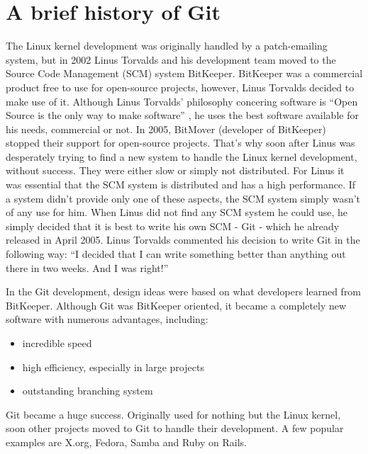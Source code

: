 \section {A brief history of Git}

The Linux kernel development was originally handled by a patch-emailing system, but in 2002 Linus Torvalds and his development team moved to the Source Code Management (SCM) system BitKeeper. BitKeeper was a commercial product free to use for open-source projects, however, Linus Torvalds decided to make use of it. Although Linus Torvalds' philosophy concering software is "`Open Source is the only way to make software"' \cite{googletechtalk2007}, he uses the best software available for his needs, commercial or not.
In 2005, BitMover (developer of BitKeeper) stopped their support for open-source projects. That's why soon after Linus was desperately trying to find a new system to handle the Linux kernel development, without success. They were either slow or simply not distributed. For Linus it was essential that the SCM system is distributed and has a high performance. If a system didn't provide only one of these aspects, the SCM system simply wasn't of any use for him. When Linus did not find any SCM system he could use, he simply decided that it is best to write his own SCM - Git - which he already released in April 2005. Linus Torvalds commented his decision to write Git in the following way: "`I decided that I can write something better than anything out there in two weeks. And I was right!"'\cite{googletechtalk2007}

In the Git development, design ideas were based on what developers learned from BitKeeper. Although Git was BitKeeper oriented, it became a completely new software with numerous advantages, including:

\begin{itemize}
	\item incredible speed
	\item high efficiency, especially in large projects
	\item outstanding branching system
\end{itemize}
\cite{gitpro2009}

Git became a huge success. Originally used for nothing but the Linux kernel, soon other projects moved to Git to handle their development. A few popular examples are X.org, Fedora, Samba and Ruby on Rails. \cite{gitinternals2008}